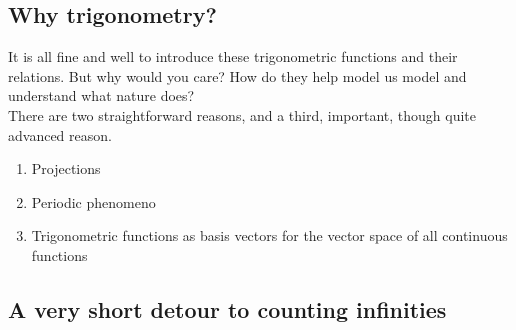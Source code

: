 \subsection{Why trigonometry?}
\label{WhyTrigo}

\noindent It is all fine and well to introduce these trigonometric functions and their relations. But why would you care? How do they help model us model and understand what nature does?\\

\noindent There are two straightforward reasons, and a third, important, though quite advanced reason.
\begin{enumerate}
\item Projections
\item Periodic phenomeno
\item Trigonometric functions as basis vectors for the vector space of all continuous functions
\end{enumerate}

\subsection{A very short detour to counting infinities}
\label{Trig_func_intro}

